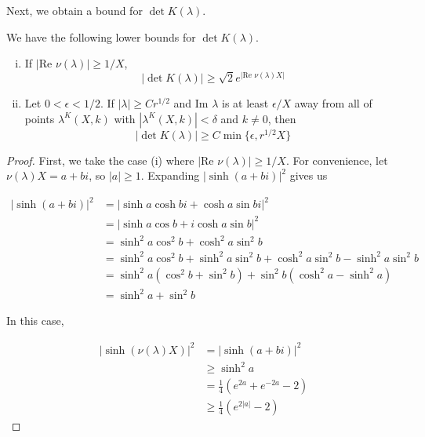\documentclass[thesis.tex]{subfiles}
\begin{document}
Next, we obtain a bound for $\det K(\lambda)$. 


\begin{lemma}\label{detKlemma}
We have the following lower bounds for $\det K(\lambda)$.
\begin{enumerate}[(i)]
\item If $|\text{Re }\nu(\lambda)| \geq 1/X$, 
\begin{equation}\label{detKbound1}
|\det K(\lambda)| \geq \sqrt{2} e^{|\text{Re }\nu(\lambda)X|}
\end{equation}
\item Let $0 < \epsilon < 1/2$. If $|\lambda| \geq C r^{1/2}$ and $\text{Im }\lambda$ is at least $\epsilon/X$ away from all of points $\lambda^K(X,k)$ with $|\lambda^K(X,k)| < \delta$ and $k \neq 0$, then
\begin{equation}\label{detKbound2}
|\det K(\lambda)|\geq C \min\{ \epsilon, r^{1/2} X \}
\end{equation}
\end{enumerate}

\begin{proof}
First, we take the case (i) where $|\text{Re }\nu(\lambda)| \geq 1/X$. For convenience, let $\nu(\lambda)X = a + bi$, so $|a| \geq 1$. Expanding $|\sinh(a + b i)|^2$ gives us

\begin{align*}
|\sinh(a + b i)|^2 
&= |\sinh a \cosh b i + \cosh a \sin b i|^2 \\
&= |\sinh a \cos b + i \cosh a \sin b |^2 \\
&= \sinh^2 a \cos^2 b + \cosh^2 a \sin^2 b \\
&= \sinh^2 a \cos^2 b + \sinh^2 a \sin^2 b 
+ \cosh^2 a \sin^2 b - \sinh^2 a \sin^2 b \\
&= \sinh^2 a (\cos^2 b + \sin^2 b) 
+ \sin^2 b( \cosh^2 a - \sinh^2 a) \\
&= \sinh^2 a + \sin^2 b
\end{align*}

In this case,

\begin{align*}
|\sinh(\nu(\lambda) X)|^2 &= |\sinh(a + b i)|^2 \\
&\geq \sinh^2 a \\
&= \frac{1}{4}\left( e^{2a} + e^{-2a} - 2 \right) \\
&\geq \frac{1}{4}\left( e^{2|a|} - 2 \right)
\end{align*}


\end{proof}
\end{lemma}
\end{document}
